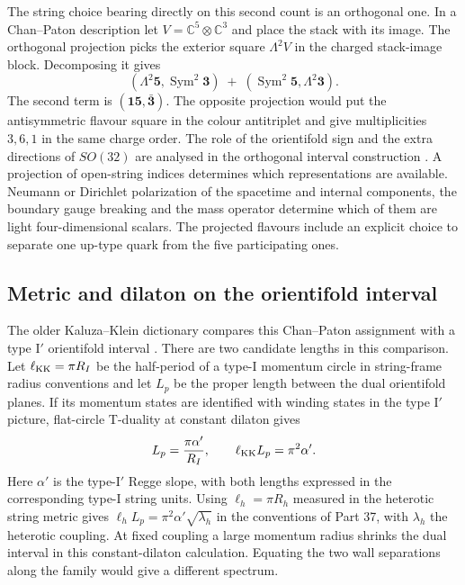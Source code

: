\documentclass[aps,prd,reprint,onecolumn,nofootinbib,amsmath,amssymb]{revtex4-2}
\begin{document}
The string choice bearing directly on this second count is an orthogonal one. In a Chan--Paton description let $V=\mathbb C^5\otimes\mathbb C^3$ and place the stack with its image. The orthogonal projection picks the exterior square $\Lambda^2 V$ in the charged stack-image block. Decomposing it gives
\begin{equation}
 (\Lambda^2\mathbf5,\operatorname{Sym}^2\mathbf3)
 \;+\;(\operatorname{Sym}^2\mathbf5,\Lambda^2\mathbf3).
\end{equation}
The second term is $(\mathbf{15},\bar{\mathbf3})$. The opposite projection would put the antisymmetric flavour square in the colour antitriplet and give multiplicities $3,6,1$ in the same charge order. The role of the orientifold sign and the extra directions of $SO(32)$ are analysed in the orthogonal interval construction \cite{realnote,Rivero2024,PW1996}. A projection of open-string indices determines which representations are available. Neumann or Dirichlet polarization of the spacetime and internal components, the boundary gauge breaking and the mass operator determine which of them are light four-dimensional scalars. The projected flavours include an explicit choice to separate one up-type quark from the five participating ones.

\subsection{Metric and dilaton on the orientifold interval}
The older Kaluza--Klein dictionary compares this Chan--Paton assignment with a type I$'$ orientifold interval \cite{dictionarynote,PW1996,BGL1998}. There are two candidate lengths in this comparison. Let $\ell_{\rm KK}=\pi R_I$ be the half-period of a type-I momentum circle in string-frame radius conventions and let $L_p$ be the proper length between the dual orientifold planes. If its momentum states are identified with winding states in the type I$'$ picture, flat-circle T-duality at constant dilaton gives
\begin{equation}
 L_p=\frac{\pi\alpha'}{R_I},\qquad
 \ell_{\rm KK} L_p=\pi^2\alpha' .
\end{equation}
Here $\alpha'$ is the type-I$'$ Regge slope, with both lengths expressed in the corresponding type-I string units. Using $\ell_h=\pi R_h$ measured in the heterotic string metric gives $\ell_h L_p=\pi^2\alpha'\sqrt{\lambda_h}$ in the conventions of Part 37, with $\lambda_h$ the heterotic coupling. At fixed coupling a large momentum radius shrinks the dual interval in this constant-dilaton calculation. Equating the two wall separations along the family would give a different spectrum.
\end{document}
